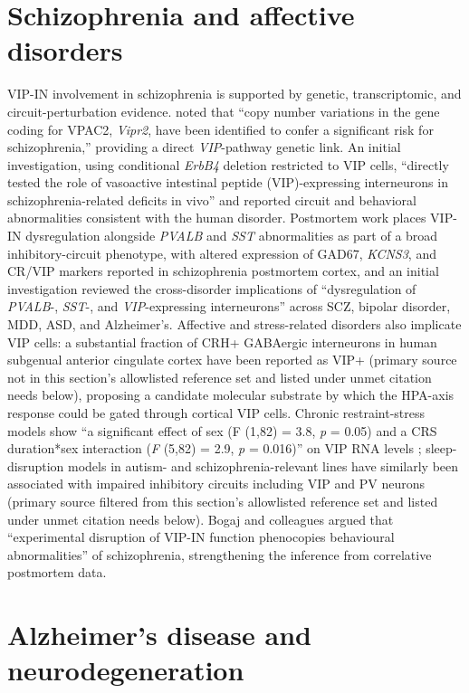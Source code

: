 \documentclass[11pt]{article}
\begin{document}
\section{Schizophrenia and affective disorders}

VIP-IN involvement in schizophrenia is supported by genetic, transcriptomic,
and circuit-perturbation evidence. \citet{Miller2025} noted that ``copy
number variations in the gene coding for VPAC2, \textit{Vipr2}, have been
identified to confer a significant risk for schizophrenia,'' providing a
direct \textit{VIP}-pathway genetic link. An initial investigation, using
conditional \textit{ErbB4} deletion restricted to VIP cells, ``directly tested the
role of vasoactive intestinal peptide (VIP)-expressing interneurons in
schizophrenia-related deficits in vivo'' and reported circuit and
behavioral abnormalities consistent with the human disorder. Postmortem
work places VIP-IN dysregulation alongside \textit{PVALB} and \textit{SST} abnormalities
as part of a broad inhibitory-circuit phenotype, with altered expression
of GAD67, \textit{KCNS3}, and CR/VIP markers reported in schizophrenia
postmortem cortex, and an initial investigation reviewed the cross-disorder
implications of ``dysregulation of \textit{PVALB}-, \textit{SST}-, and \textit{VIP}-expressing
interneurons'' across SCZ, bipolar disorder, MDD, ASD, and Alzheimer's.
Affective and stress-related disorders also implicate VIP cells: a
substantial fraction of CRH+ GABAergic interneurons in human
subgenual anterior cingulate cortex have been reported as VIP+
(primary source not in this section's allowlisted reference set and
listed under unmet citation needs below), proposing a candidate molecular
substrate by which the HPA-axis response could be gated through
cortical VIP cells. Chronic
restraint-stress models show ``a significant effect of sex (F (1,82) = 3.8,
\textit{p} = 0.05) and a CRS duration*sex interaction (\textit{F} (5,82) = 2.9, \textit{p} =
0.016)'' on VIP RNA levels \citep{Prevot2025}; sleep-disruption
models in autism- and schizophrenia-relevant lines have similarly
been associated with impaired inhibitory circuits including VIP and
PV neurons (primary source filtered from this section's allowlisted reference set and listed under
unmet citation needs below). Bogaj and
colleagues argued that ``experimental disruption of
VIP-IN function phenocopies behavioural abnormalities'' of schizophrenia,
strengthening the inference from correlative postmortem data.

\section{Alzheimer's disease and neurodegeneration}
\end{document}
